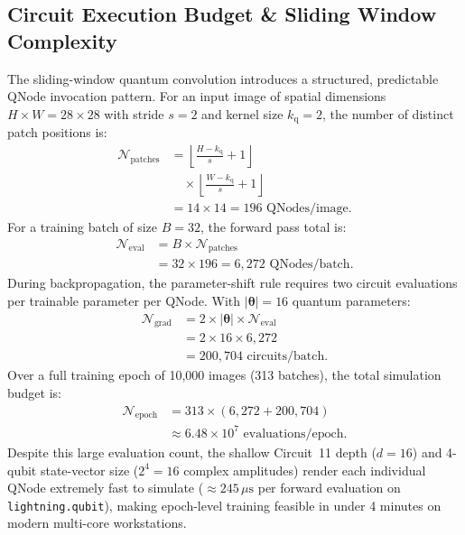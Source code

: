 \documentclass[journal]{IEEEtran}
\begin{document}
\subsection{Circuit Execution Budget \& Sliding Window Complexity}
The sliding-window quantum convolution introduces a structured, predictable QNode invocation pattern. For an input image of spatial dimensions $H \times W = 28 \times 28$ with stride $s = 2$ and kernel size $k_{\mathrm{q}} = 2$, the number of distinct patch positions is:
\begin{align}
\mathcal{N}_{\mathrm{patches}} &= \left\lfloor \frac{H - k_{\mathrm{q}}}{s} + 1 \right\rfloor \nonumber \\
&\quad \times \left\lfloor \frac{W - k_{\mathrm{q}}}{s} + 1 \right\rfloor \nonumber \\
&= 14 \times 14 = 196 \text{ QNodes/image}.
\label{eq:patch_count}
\end{align}
For a training batch of size $B = 32$, the forward pass total is:
\begin{align}
\mathcal{N}_{\mathrm{eval}} &= B \times \mathcal{N}_{\mathrm{patches}} \nonumber \\
&= 32 \times 196 = 6,272 \text{ QNodes/batch}.
\label{eq:qnode_budget}
\end{align}
During backpropagation, the parameter-shift rule requires two circuit evaluations per trainable parameter per QNode. With $|\boldsymbol{\theta}| = 16$ quantum parameters:
\begin{align}
\mathcal{N}_{\mathrm{grad}} &= 2 \times |\boldsymbol{\theta}| \times \mathcal{N}_{\mathrm{eval}} \nonumber \\
&= 2 \times 16 \times 6{,}272 \nonumber \\
&= 200{,}704 \text{ circuits/batch}.
\label{eq:grad_eval_budget}
\end{align}
Over a full training epoch of 10,000 images (313 batches), the total simulation budget is:
\begin{align}
\mathcal{N}_{\mathrm{epoch}} &= 313 \times (6{,}272 + 200{,}704) \nonumber \\
&\approx 6.48 \times 10^7 \text{ evaluations/epoch}.
\end{align}
Despite this large evaluation count, the shallow Circuit~11 depth ($d = 16$) and 4-qubit state-vector size ($2^4 = 16$ complex amplitudes) render each individual QNode extremely fast to simulate ($\approx 245\,\mu\mathrm{s}$ per forward evaluation on \texttt{lightning.qubit}), making epoch-level training feasible in under 4 minutes on modern multi-core workstations.
\end{document}
